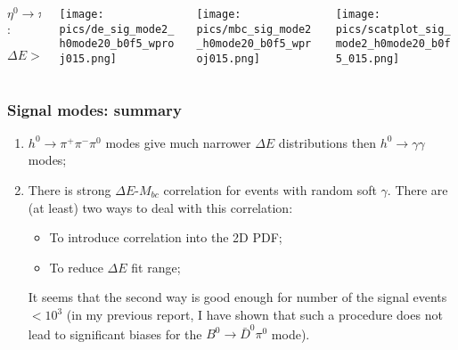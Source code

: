 \documentclass[10 pt,compress,mathserif]{beamer}
\newcommand{\bdpi}{\ensuremath{B^0\to \bar D^0\pi^0}\xspace}
\newcommand{\hgg}{\ensuremath{h^0\to \gamma\gamma}\xspace}
\newcommand{\etappp}{\ensuremath{\eta^0\to \pi^+\pi^-\pi^0}\xspace}
\newcommand{\hppp}{\ensuremath{h^0\to \pi^+\pi^-\pi^0}\xspace}
\begin{document}
\begin{frame}
\begin{small}
  \begin{columns}
  \begin{column}{0.2\textwidth}
   $\etappp$:\\
   \begin{tiny}
   $\Delta E>-0.15\ \text{GeV}$
   \end{tiny}
  \end{column}
  \begin{column}{0.25\textwidth}
   \begin{center}
    {\texttt{[image: pics/de\_sig\_mode2\_h0mode20\_b0f5\_wproj015.png]}}
   \end{center}
  \end{column}
  \begin{column}{0.25\textwidth}
   \begin{center}
    {\texttt{[image: pics/mbc\_sig\_mode2\_h0mode20\_b0f5\_wproj015.png]}}
   \end{center}
  \end{column}
  \begin{column}{0.3\textwidth}
   \begin{center}
    {\texttt{[image: pics/scatplot\_sig\_mode2\_h0mode20\_b0f5\_015.png]}}
   \end{center}
   \end{column}
  \end{columns}
 \end{small}
\end{frame}

\begin{frame}
 \frametitle{Signal modes: summary}
 \begin{enumerate}
  \item \hppp modes give much narrower $\Delta E$ distributions then \hgg modes;
  \item There is strong $\Delta E$-$M_{bc}$ correlation for events with random soft $\gamma$. There are (at least) two ways to deal with this correlation:
  \begin{itemize}
   \item To introduce correlation into the 2D PDF;
   \item To reduce $\Delta E$ fit range;
  \end{itemize}
  It seems that the second way is good enough for number of the signal events $<10^3$ (in my previous report, I have shown that such a procedure does not lead to significant biases for the \bdpi mode).
 \end{enumerate}
\end{frame}
\end{document}
